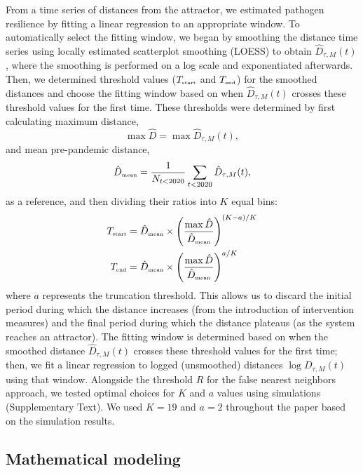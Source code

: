 \documentclass[12pt]{article}
\newcommand{\tsub}[2]{#1_{{\textrm{\tiny #2}}}}
\begin{document}
From a time series of distances from the attractor, we estimated pathogen resilience by fitting a linear regression to an appropriate window.
To automatically select the fitting window, we began by smoothing the distance time series using locally estimated scatterplot smoothing (LOESS) to obtain $\hat{D}_{\tau,M}(t)$, where the smoothing is performed on a log scale and exponentiated afterwards.
Then, we determined threshold values ($\tsub{T}{start}$ and $\tsub{T}{end}$) for the smoothed distances and choose the fitting window based on when $\hat{D}_{\tau,M}(t)$ crosses these threshold values for the first time.
These thresholds were determined by first calculating maximum distance,
\begin{equation}
\max \hat{D} = \max \hat{D}_{\tau,M}(t),
\end{equation}
and mean pre-pandemic distance,
\begin{equation}
\tsub{\hat{D}}{mean} = \frac{1}{N_{t<2020}} \sum_{t < 2020} \hat{D}_{\tau,M}(t),
\end{equation}
as a reference, and then dividing their ratios into $K$ equal bins:
\begin{align}
\tsub{T}{start} &= \tsub{\hat{D}}{mean} \times \left(\frac{\max \hat{D}}{\tsub{\hat{D}}{mean}} \right)^{(K-a)/K}\\
\tsub{T}{end} &= \tsub{\hat{D}}{mean} \times \left(\frac{\max \hat{D}}{\tsub{\hat{D}}{mean}} \right)^{a/K}
\end{align}
where $a$ represents the truncation threshold.
This allows us to discard the initial period during which the distance increases (from the introduction of intervention measures) and the final period during which the distance plateaus (as the system reaches an attractor).
The fitting window is determined based on when the smoothed distance $\hat{D}_{\tau,M}(t)$ crosses these threshold values for the first time; then, we fit a linear regression to logged (unsmoothed) distances $\log D_{\tau,M}(t)$ using that window.
Alongside the threshold $R$ for the false nearest neighbors approach, we tested optimal choices for $K$ and $a$ values using simulations (Supplementary Text).
We used $K=19$ and $a=2$ throughout the paper based on the simulation results.

\subsection*{Mathematical modeling}
\end{document}
